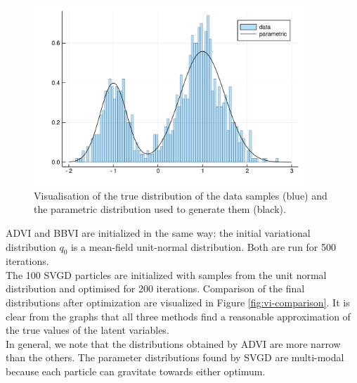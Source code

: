 \begin{figure} 
	\centering
	\includegraphics[width=4in]{images/vi_comp_data.pdf}
    \caption[VI comparison: true distribution of the data.]{Visualisation of the true distribution of the data samples (blue) and the parametric distribution used to generate them (black).}
    \label{fig:vi-comparison-data}
\end{figure}


    ADVI and BBVI are initialized in the same way: the initial variational distribution $q_0$ is a mean-field unit-normal distribution. Both are run for 500 iterations. 
    \\
    The 100 SVGD particles are initialized with samples from the unit normal distribution and optimised for 200 iterations. Comparison of the final distributions after optimization are visualized in Figure \ref{fig:vi-comparison}. It is clear from the graphs that all three methods find a reasonable approximation of the true values of the latent variables.
    \\ 
    In general, we note that the distributions obtained by ADVI are more narrow than the others. The parameter distributions found by SVGD are multi-modal because each particle can gravitate towards either optimum.
    

